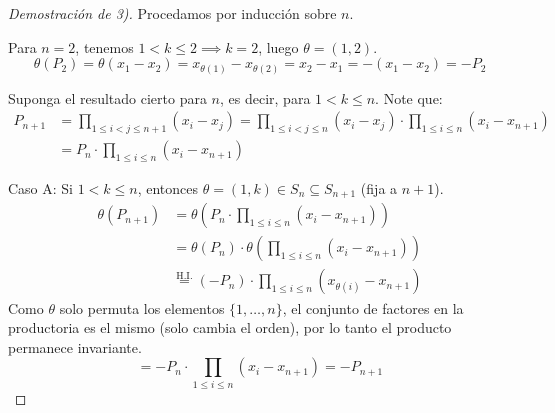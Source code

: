 \begin{proof}[Demostración de 3)]
    Procedamos por inducción sobre $n$.
    
    Para $n=2$, tenemos $1 < k \leq 2 \implies k=2$, luego $\theta=(1, 2)$.
    \begin{equation*}
        \theta(P_2) = \theta(x_1 - x_2) = x_{\theta(1)} - x_{\theta(2)} = x_2 - x_1 = -(x_1 - x_2) = -P_2
    \end{equation*}
    
    Suponga el resultado cierto para $n$, es decir, para $1 < k \leq n$. Note que:
    \begin{equation*}
    \begin{aligned}
        P_{n+1} &= \prod_{1 \leq i < j \leq n+1} (x_i - x_j) = \prod_{1 \leq i < j \leq n} (x_i - x_j) \cdot \prod_{1 \leq i \leq n} (x_i - x_{n+1}) \\
        &= P_n \cdot \prod_{1 \leq i \leq n} (x_i - x_{n+1})
    \end{aligned}
    \end{equation*}
    
    Caso A: Si $1 < k \leq n$, entonces $\theta = (1, k) \in S_n \subseteq S_{n+1}$ (fija a $n+1$).
    \begin{equation*}
    \begin{aligned}
        \theta(P_{n+1}) &= \theta \left( P_n \cdot \prod_{1 \leq i \leq n} (x_i - x_{n+1}) \right) \\
        &= \theta(P_n) \cdot \theta \left( \prod_{1 \leq i \leq n} (x_i - x_{n+1}) \right) \\
        &\overset{\text{H.I.}}{=} (-P_n) \cdot \prod_{1 \leq i \leq n} (x_{\theta(i)} - x_{n+1})
    \end{aligned}
    \end{equation*}
    Como $\theta$ solo permuta los elementos $\{1, \dots, n\}$, el conjunto de factores en la productoria es el mismo (solo cambia el orden), por lo tanto el producto permanece invariante.
    \begin{equation*}
        = -P_n \cdot \prod_{1 \leq i \leq n} (x_i - x_{n+1}) = -P_{n+1}
    \end{equation*}
    

\end{proof}
